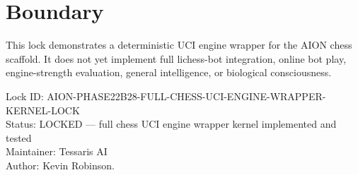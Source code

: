 \documentclass[11pt,a4paper]{article}
\begin{document}
\section{Boundary}

This lock demonstrates a deterministic UCI engine wrapper for the AION chess scaffold. It does not yet implement full lichess-bot integration, online bot play, engine-strength evaluation, general intelligence, or biological consciousness.

\bigskip

\noindent
Lock ID: AION-PHASE22B28-FULL-CHESS-UCI-ENGINE-WRAPPER-KERNEL-LOCK\\
Status: LOCKED --- full chess UCI engine wrapper kernel implemented and tested\\
Maintainer: Tessaris AI\\
Author: Kevin Robinson.
\end{document}
